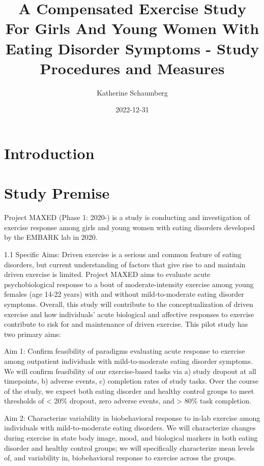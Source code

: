\documentclass[
]{book}
\title{A Compensated Exercise Study For Girls And Young Women With Eating Disorder Symptoms - Study Procedures and Measures}
\author{Katherine Schaumberg}
\date{2022-12-31}
\begin{document}
\maketitle

{
\setcounter{tocdepth}{1}
\tableofcontents
}
\hypertarget{introduction}{%
\chapter{Introduction}\label{introduction}}

\hypertarget{study-premise}{%
\chapter{Study Premise}\label{study-premise}}

Project MAXED (Phase 1: 2020-) is a study is conducting and investigation of exercise response among girls and young women with eating disorders developed by the EMBARK lab in 2020.

1.1 Specific Aims:
Driven exercise is a serious and common feature of eating disorders, but current understanding of factors that give rise to and maintain driven exercise is limited. Project MAXED aims to evaluate acute psychobiological response to a bout of moderate-intensity exercise among young females (age 14-22 years) with and without mild-to-moderate eating disorder symptoms. Overall, this study will contribute to the conceptualization of driven exercise and how individuals' acute biological and affective responses to exercise contribute to risk for and maintenance of driven exercise. This pilot study has two primary aims:

Aim 1: Confirm feasibility of paradigms evaluating acute response to exercise among outpatient individuals with mild-to-moderate eating disorder symptoms. We will confirm feasibility of our exercise-based tasks via a) study dropout at all timepoints, b) adverse events, c) completion rates of study tasks. Over the course of the study, we expect both eating disorder and healthy control groups to meet thresholds of \textless{} 20\% dropout, zero adverse events, and \textgreater{} 80\% task completion.

Aim 2: Characterize variability in biobehavioral response to in-lab exercise among individuals with mild-to-moderate eating disorders. We will characterize changes during exercise in state body image, mood, and biological markers in both eating disorder and healthy control groups; we will specifically characterize mean levels of, and variability in, biobehavioral response to exercise across the groups.
\end{document}
